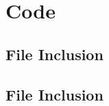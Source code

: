 \documentclass[11pt]{article}
\newcommand{\Verilog}[2][]{%
	
}
\begin{document}
\section*{Code}

\subsection*{File Inclusion}
\Verilog[caption=Add3 Verilog code,label=code:file_ex]{add3.sv}

\subsection*{File Inclusion}
\Verilog[caption=Add3 Multiplexer Test Benches Verilog code,label=code:file_ex]{add3_test.sv}
\end{document}
